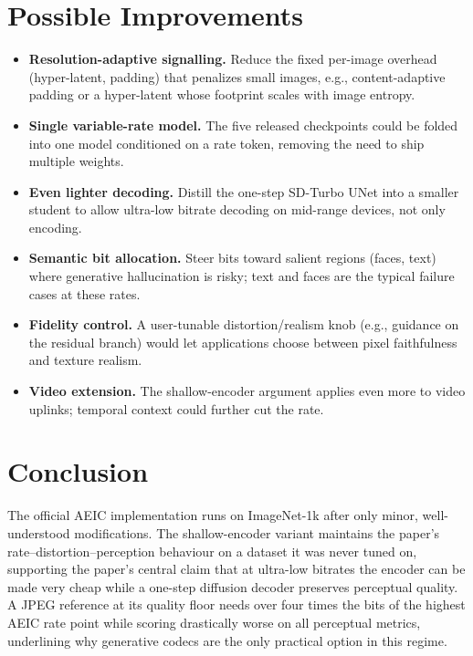 \documentclass[conference]{IEEEtran}
\begin{document}
\section{Possible Improvements}
\begin{itemize}
\item \textbf{Resolution-adaptive signalling.} Reduce the fixed per-image overhead (hyper-latent,
padding) that penalizes small images, e.g., content-adaptive padding or a hyper-latent whose
footprint scales with image entropy.
\item \textbf{Single variable-rate model.} The five released checkpoints could be folded into one
model conditioned on a rate token, removing the need to ship multiple weights.
\item \textbf{Even lighter decoding.} Distill the one-step SD-Turbo UNet into a smaller student
to allow ultra-low bitrate decoding on mid-range devices, not only encoding.
\item \textbf{Semantic bit allocation.} Steer bits toward salient regions (faces, text) where
generative hallucination is risky; text and faces are the typical failure cases at these rates.
\item \textbf{Fidelity control.} A user-tunable distortion/realism knob (e.g., guidance on the
residual branch) would let applications choose between pixel faithfulness and texture realism.
\item \textbf{Video extension.} The shallow-encoder argument applies even more to video uplinks;
temporal context could further cut the rate.
\end{itemize}

\section{Conclusion}
The official AEIC implementation runs on ImageNet-1k after only minor, well-understood
modifications. The shallow-encoder variant maintains the paper's rate--distortion--perception
behaviour on a dataset it was never tuned on, supporting the paper's central claim that at
ultra-low bitrates the encoder can be made very cheap while a one-step diffusion decoder
preserves perceptual quality. A JPEG reference at its quality floor needs over four times the
bits of the highest AEIC rate point while scoring drastically worse on all perceptual metrics,
underlining why generative codecs are the only practical option in this regime.
\end{document}
